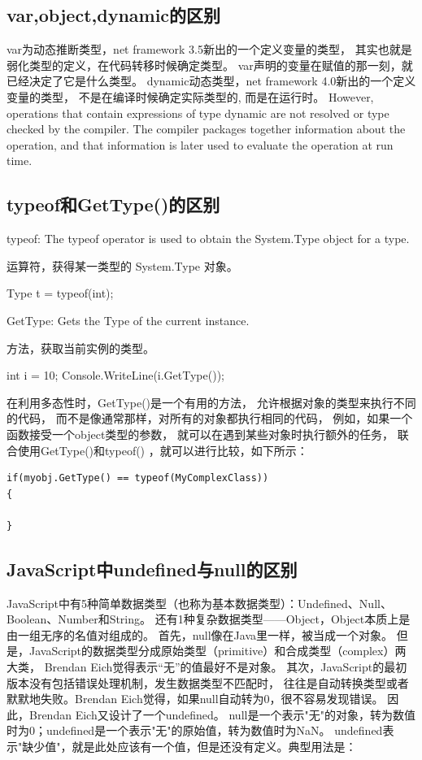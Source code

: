 \documentclass{book}
\newcounter{coderemarks}   %
\newcounter{codevar}     %
\newcommand{\circlemark}[1]{%
\tikz\node[text=white,font=\sffamily\bfseries,inner sep=0.2mm,draw,circle,fill=black]{#1};}
\newcommand{\showremarks}{%
\begin{list}{\circlemark{\arabic{codevar}}} %
{} %
\whiledo{\value{codevar} < \value{coderemarks}}{ %
\item \expandafter\csname codebox\the\value{codevar}\endcsname %
\stepcounter{codevar}} %
\end{list} %
\setcounter{coderemarks}{1}%
\setcounter{codevar}{1}%
}
\begin{document}
\showremarks

\subsection{var,object,dynamic的区别}

var为动态推断类型，net framework 3.5新出的一个定义变量的类型，
其实也就是弱化类型的定义，在代码转移时候确定类型。
var声明的变量在赋值的那一刻，就已经决定了它是什么类型。
dynamic动态类型，net framework 4.0新出的一个定义变量的类型，
不是在编译时候确定实际类型的, 而是在运行时。
However, operations that contain expressions of type dynamic 
are not resolved or type checked by the compiler. 
The compiler packages together information about the operation, 
and that information is later used to evaluate the operation at run time. 

\subsection{typeof和GetType()的区别}

typeof: The typeof operator is used to obtain the System.Type object for a type.
 
运算符，获得某一类型的 System.Type 对象。
 
Type t = typeof(int); 
 
 
GetType: Gets the Type of the current instance.
 
方法，获取当前实例的类型。
 
int i = 10;
Console.WriteLine(i.GetType());

在利用多态性时，GetType()是一个有用的方法，
允许根据对象的类型来执行不同的代码，
而不是像通常那样，对所有的对象都执行相同的代码，
例如，如果一个函数接受一个object类型的参数，
就可以在遇到某些对象时执行额外的任务，
联合使用GetType()和typeof() ，就可以进行比较，如下所示：
 
\begin{lstlisting}[language={[Sharp]C}]
if(myobj.GetType() == typeof(MyComplexClass))
{

}
\end{lstlisting}

\subsection{JavaScript中undefined与null的区别}

JavaScript中有5种简单数据类型（也称为基本数据类型）：Undefined、Null、Boolean、Number和String。
还有1种复杂数据类型——Object，Object本质上是由一组无序的名值对组成的。
首先，null像在Java里一样，被当成一个对象。
但是，JavaScript的数据类型分成原始类型（primitive）和合成类型（complex）两大类，
Brendan Eich觉得表示“无”的值最好不是对象。
其次，JavaScript的最初版本没有包括错误处理机制，发生数据类型不匹配时，
往往是自动转换类型或者默默地失败。Brendan Eich觉得，如果null自动转为0，很不容易发现错误。
因此，Brendan Eich又设计了一个undefined。
null是一个表示"无"的对象，转为数值时为0；undefined是一个表示"无"的原始值，转为数值时为NaN。
undefined表示"缺少值"，就是此处应该有一个值，但是还没有定义。典型用法是：
\end{document}
